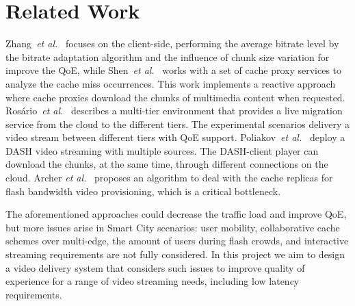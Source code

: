 \section*{Related Work}
\label{sec:releated-work}

Zhang~\textit{et al.}~\cite{zhangINFOCOM17} focuses on the client-side, performing the average bitrate level by the bitrate adaptation algorithm and the influence of chunk size variation for improve the QoE, while Shen~\textit{et al.}~\cite{shenIWQoS19} works with a set of cache proxy services to analyze the cache miss occurrences. This work implements a reactive approach where cache proxies download the chunks of multimedia content when requested. Rosário~\textit{et al.}~\cite{rosarioSENSORS2018} describes a multi-tier environment that provides a live migration service from the cloud to the different tiers. The experimental scenarios delivery a video stream between different tiers with QoE support.
Poliakov~\textit{et al.}~\cite{poliakovPHD2018} deploy a DASH video streaming with multiple  sources. The DASH-client player can download the chunks, at the same time, through different connections on the cloud.
Archer \textit{et al.}~\cite{archerGoogleJournal2019} proposes an algorithm to deal with the cache replicas for flash bandwidth video provisioning, which is a critical bottleneck.

The aforementioned approaches could decrease the traffic load and improve QoE, but more issues arise in Smart City scenarios: user mobility, collaborative cache schemes over multi-edge, the amount of users during flash crowds, and interactive streaming requirements are not fully considered. In this project we aim to design a video delivery system that considers such issues to improve quality of experience for a range of video streaming needs, including low latency requirements.
